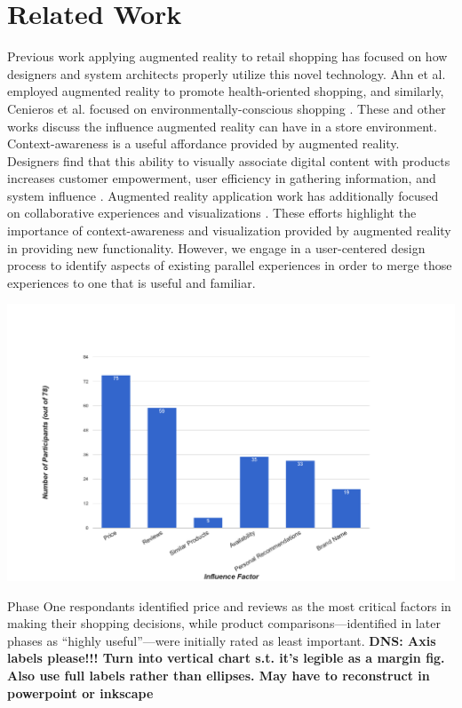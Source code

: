 \section{Related Work}

Previous work applying augmented reality to retail shopping has focused on how designers and system architects properly utilize this novel technology. Ahn et al. employed augmented reality to promote health-oriented shopping\cite{ahn2015supporting}, and similarly, Cenieros et al. focused on environmentally-conscious shopping \cite{ceniceros2014augmented}. These and other works \cite{esser2016head,stoyanova2015comparison} discuss the influence augmented reality can have in a store environment. Context-awareness is a useful affordance provided by augmented reality.  Designers find that this ability to visually associate digital content with products increases customer empowerment, user efficiency in gathering information, and system influence \cite{kourouthanassis2007enhancing,olsson2013expected,zhu2004personalized}. Augmented reality application work has additionally focused on collaborative experiences and visualizations \cite{esser2016head,santos2016augmented,stoyanova2015comparison,truong2013today}. These efforts highlight the importance of context-awareness and visualization provided by augmented reality in providing new functionality. However, we engage in a user-centered design process to identify aspects of existing parallel experiences in order to merge those experiences to one that is useful and familiar.

\begin{marginfigure}
	\begin{minipage}{\marginparwidth}
		\includegraphics[width=0.9\columnwidth]{figures/ShoppingFactors}
		\caption{Phase One respondants identified price and reviews as the most critical factors in making their shopping decisions, while product comparisons---identified in later phases as ``highly useful''---were initially rated as least important. \textbf{DNS: Axis labels please!!! Turn into vertical chart s.t. it's legible as a margin fig. Also use full labels rather than ellipses. May have to reconstruct in powerpoint or inkscape}}
		\label{figures:ShoppingFactors}
	\end{minipage}
\end{marginfigure}

